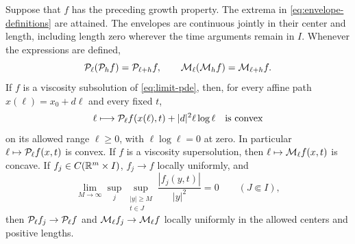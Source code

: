 \begin{lemma}\label{lem:quadratic-envelopes}
Suppose that $f$ has the preceding growth property. The extrema
in \eqref{eq:envelope-definitions} are attained. The envelopes
are continuous jointly in their center and length, including
length zero wherever the time arguments remain in $I$. Whenever
the expressions are defined,
\begin{equation}\label{eq:envelope-composition}
  \mathcal{P}_\ell(\mathcal{P}_hf)=\mathcal{P}_{\ell+h}f,\qquad
  \mathcal{M}_\ell(\mathcal{M}_hf)=\mathcal{M}_{\ell+h}f.
\end{equation}
If $f$ is a viscosity subsolution of \eqref{eq:limit-pde}, then,
for every affine path $x(\ell)=x_0+d\ell$ and every fixed $t$,
\begin{equation}\label{eq:path-envelope-convexity}
  \ell\longmapsto
  \mathcal{P}_\ell f(x(\ell),t)+|d|^2\ell\log\ell
  \quad\text{is convex}
\end{equation}
on its allowed range $\ell\ge0$, with $\ell\log\ell=0$ at zero.
In particular $\ell\mapsto\mathcal{P}_\ell f(x,t)$ is convex.
If $f$ is a viscosity supersolution, then
$\ell\mapsto\mathcal{M}_\ell f(x,t)$ is concave.
If $f_j\in C(\mathbb{R}^m\times I)$, $f_j\to f$ locally uniformly, and
\[
  \lim_{M\to\infty}\sup_j\sup_{\substack{|y|\ge M\\t\in J}}
      \frac{|f_j(y,t)|}{|y|^2}=0\qquad(J\Subset I),
\]
then
$\mathcal{P}_\ell f_j\to\mathcal{P}_\ell f$ and $\mathcal{M}_\ell f_j\to\mathcal{M}_\ell f$
locally uniformly in the allowed centers and positive lengths.
\end{lemma}

